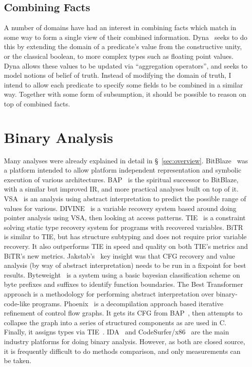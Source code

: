 \subsection{Combining Facts}
A number of domains have had an interest in combining facts which match in some way to form a single view of their combined information.
Dyna~\cite{dyna} seeks to do this by extending the domain of a predicate's value from the constructive unity, or the classical boolean, to more complex types such as floating point values.
Dyna allows these values to be updated via ``aggregation operators'', and seeks to model notions of belief of truth.
Instead of modifying the domain of truth, I intend to allow each predicate to specify some fields to be combined in a similar way.
Together with some form of subsumption, it should be possible to reason on top of combined facts.

\section{Binary Analysis}
Many analyses were already explained in detail in \S~\ref{sec:overview}.
BitBlaze~\cite{bitblaze} was a platform intended to allow platform independent representation and symbolic execution of various architectures.
BAP~\cite{bap} is the spiritual successor to BitBlaze, with a similar but improved IR, and more practical analyses built on top of it.
VSA~\cite{vsa} is an analysis using abstract interpretation to predict the possible range of values for various.
DIVINE~\cite{divine} is a variable recovery system based around doing pointer analysis using VSA, then looking at access patterns.
TIE~\cite{tie} is a constraint solving static type recovery system for programs with recovered variables.
BiTR~\cite{bitr} is similar to TIE, but has structure subtyping and does not require prior variable recovery. It also outperforms TIE in speed and quality on both TIE's metrics and BiTR's new metrics.
Jakstab's~\cite{jakstab} key insight was that CFG recovery and value analysis (by way of abstract interpretation) needs to be run in a fixpoint for best results.
Byteweight~\cite{byteweight} is a system using a basic bayesian classification scheme on byte prefixes and suffixes to identify function boundaries.
The Best Transformer~\cite{besttransformer} approach is a methodology for performing abstract interpretation over binary-code-like programs.
Phoenix~\cite{phoenix} is a decompilation approach based iterative refinement of control flow graphs. It gets its CFG from BAP~\cite{bap}, then attempts to collapse the graph into a series of structured components as are used in C. Finally, it assigns types via TIE~\cite{tie}.
IDA~\cite{ida} and CodeSurfer/x86~\cite{codesurfer} are the main industry platforms for doing binary analysis. However, as both are closed source, it is frequently difficult to do methods comparison, and only measurements can be taken.

